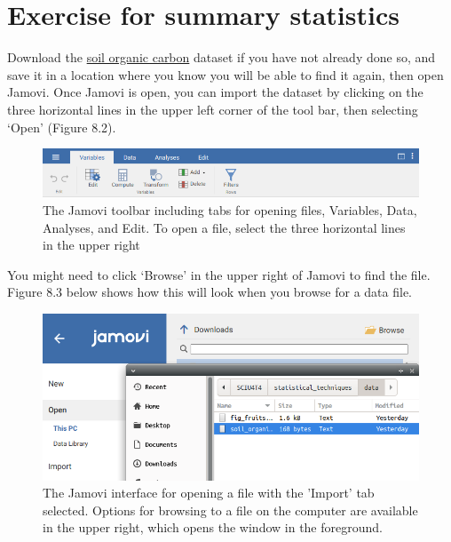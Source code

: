 \documentclass[
]{scrbook}
\begin{document}
\hypertarget{summary_statistics_02}{%
\section{Exercise for summary statistics}\label{summary_statistics_02}}

Download the \href{https://raw.githubusercontent.com/bradduthie/statistical_techniques/main/data/soil_organic_carbon.csv}{soil organic carbon} dataset if you have not already done so, and save it in a location where you know you will be able to find it again, then open Jamovi.
Once Jamovi is open, you can import the dataset by clicking on the three horizontal lines in the upper left corner of the tool bar, then selecting `Open' (Figure 8.2).

\begin{figure}
\includegraphics[width=1\linewidth]{img/jamovi_toolbar} \caption{The Jamovi toolbar including tabs for opening files, Variables, Data, Analyses, and Edit. To open a file, select the three horizontal lines in the upper right}\label{fig:unnamed-chunk-25}
\end{figure}

You might need to click `Browse' in the upper right of Jamovi to find the file.
Figure 8.3 below shows how this will look when you browse for a data file.

\begin{figure}
\includegraphics[width=1\linewidth]{img/open_soil_organic_carbon} \caption{The Jamovi interface for opening a file with the 'Import' tab selected. Options for browsing to a file on the computer are available in the upper right, which opens the window in the foreground.}\label{fig:unnamed-chunk-26}
\end{figure}
\end{document}
